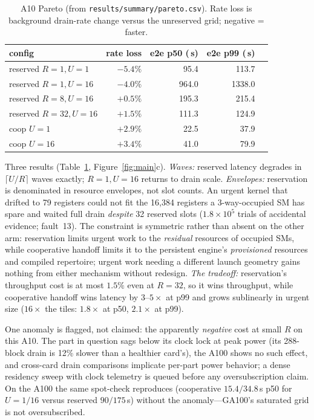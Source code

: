 \documentclass[11pt]{article}
\newcommand{\us}{\,\textmu s\xspace}
\begin{document}
\begin{table}[t]
  \centering
  \caption{A10 Pareto (from \texttt{results/summary/pareto.csv}).
  Rate loss is background drain-rate change versus the unreserved
  grid; negative = faster.}
  \label{tab:pareto}
  \begin{tabular}{lrrrr}
    \toprule
    config & rate loss & e2e p50 (\us) & e2e p99 (\us) \\
    \midrule
    reserved $R{=}1, U{=}1$  & $-5.4\%$ & 95.4  & 113.7 \\
    reserved $R{=}1, U{=}16$ & $-4.0\%$ & 964.0 & 1338.0 \\
    reserved $R{=}8, U{=}16$ & $+0.5\%$ & 195.3 & 215.4 \\
    reserved $R{=}32, U{=}16$& $+1.5\%$ & 111.3 & 124.9 \\
    coop $U{=}1$             & $+2.9\%$ & 22.5  & 37.9 \\
    coop $U{=}16$            & $+3.4\%$ & 41.0  & 79.9 \\
    \bottomrule
  \end{tabular}
\end{table}

Three results (Table~\ref{tab:pareto}, Figure~\ref{fig:main}c).
\emph{Waves:} reserved latency degrades in $\lceil U/R \rceil$ waves
exactly; $R{=}1,U{=}16$ returns to drain scale. \emph{Envelopes:}
reservation is denominated in resource envelopes, not slot counts. An
urgent kernel that drifted to 79 registers could not fit the
16{,}384 registers a 3-way-occupied SM has spare and waited full
drain \emph{despite} 32 reserved slots ($1.8\times10^5$ trials of
accidental evidence; fault~13). The constraint is symmetric rather
than absent on the other arm: reservation limits urgent work to the
\emph{residual} resources of occupied SMs, while cooperative handoff
limits it to the persistent engine's \emph{provisioned} resources and
compiled repertoire; urgent work needing a different launch geometry
gains nothing from either mechanism without redesign. \emph{The
tradeoff:} reservation's throughput cost is at most $1.5\%$ even at
$R{=}32$, so it wins throughput, while cooperative handoff wins
latency by $3$--$5\times$ at p99 and grows sublinearly in urgent size
($16\times$ the tiles: $1.8\times$ at p50, $2.1\times$ at p99).

One anomaly is flagged, not claimed: the apparently \emph{negative}
cost at small $R$ on this A10. The part in question sags below its
clock lock at peak power (its 288-block drain is 12\% slower than a
healthier card's), the A100 shows no such effect, and cross-card
drain comparisons implicate per-part power behavior; a dense
residency sweep with clock telemetry is queued before any
oversubscription claim. On the A100 the same spot-check reproduces
(cooperative $15.4/34.8$\us{} p50 for $U{=}1/16$ versus reserved
$90/175$\us) without the anomaly---GA100's saturated grid is not
oversubscribed.
\end{document}
